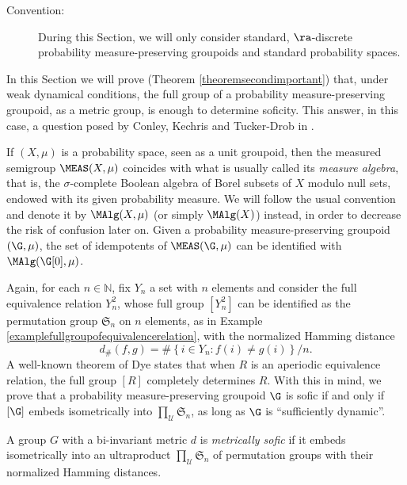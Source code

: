 \begin{description}
\item[Convention:] During this Section, we will only consider standard, $\ra$-discrete probability measure-preserving groupoids and standard probability spaces.
\end{description}

In this Section we will prove (Theorem \ref{theoremsecondimportant}) that, under weak dynamical conditions, the  full group of a probability measure-preserving groupoid, as a metric group, is enough to determine soficity. This answer, in this case, a question posed by Conley, Kechris and Tucker-Drob in \cite{MR3035288}.

If $(X,\mu)$ is a probability space, seen as a unit groupoid, then the measured semigroup $\MEAS(X,\mu)$ coincides with what is usually called its \emph{measure algebra}, that is, the $\sigma$-complete Boolean algebra of Borel subsets of $X$ modulo null sets, endowed with its given probability measure. We will follow the usual convention and denote it by $\MAlg(X,\mu)$ (or simply $\MAlg(X)$) instead, in order to decrease the risk of confusion later on. Given a probability measure-preserving groupoid $(\G,\mu)$, the set of idempotents of $\MEAS(\G,\mu)$ can be identified with $\MAlg(\G[0],\mu)$.

Again, for each $n\in\mathbb{N}$, fix $Y_n$ a set with $n$ elements and consider the full equivalence relation $Y_n^2$, whose full group $[Y_n^2]$ can be identified as the permutation group $\mathfrak{S}_n$ on $n$ elements, as in Example \ref{examplefullgroupofequivalencerelation}, with the normalized Hamming distance
\[d_\#(f,g)=\#\left\{i\in Y_n:f(i)\neq g(i)\right\}/n.\]
A well-known theorem of Dye \cite{MR0158048} states that when $R$ is an aperiodic equivalence relation, the full group $[R]$ completely determines $R$. With this in mind, we prove that a probability measure-preserving groupoid $\G$ is sofic if and only if $[\G]$ embeds isometrically into $\prod_{\mathcal{U}}\mathfrak{S}_n$, as long as $\G$ is ``sufficiently dynamic''.

\begin{definition}
A group $G$ with a bi-invariant metric $d$ is \emph{metrically sofic} if it embeds isometrically into an ultraproduct $\prod_\mathcal{U}\mathfrak{S}_n$ of permutation groups with their normalized Hamming distances.
\end{definition}

